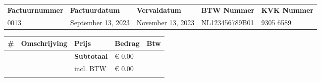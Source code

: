 \documentclass{article}%
\begin{document}
\begin{minipage}{\textwidth}%
\flushleft%
\begin{tabularx}{\textwidth}{XXXXX}%
\textbf{Factuurnummer}&\textbf{Factuurdatum}&\textbf{Vervaldatum}&\textbf{BTW Nummer}&\textbf{KVK Nummer}\\%
0013&September 13, 2023&November 13, 2023&NL123456789B01&9305 6589\\%
\end{tabularx}%
\linebreak%
\linebreak%
\linebreak%
\linebreak%
\begin{tabularx}{\textwidth}{lXlll}%
\textbf{\#}&\textbf{Omschrijving}&\textbf{Prijs}&\textbf{Bedrag}&\textbf{Btw}\\%
\hline%
&&\textbf{Subtotaal}&€ 0.00&\\%
&&incl. BTW&€ 0.00 \\ \cline{3-4}&\\%
\end{tabularx}%
\end{minipage}%
\end{document}
